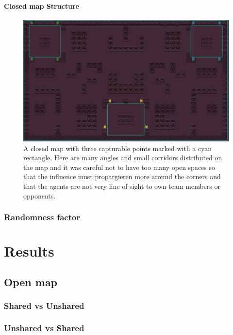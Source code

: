 \documentclass[]{report}
\begin{document}
		\subsubsection{Closed map Structure}
		\begin{figure}[h!]
			\centering
			\includegraphics[width=1\linewidth]{Images/closemap}
			\caption[Close map structure]{A closed map with three capturable points marked with a cyan rectangle. Here are many angles and small corridors distributed on the map and it was careful not to have too many open spaces so that the influence must propargieren more around the corners and that the agents are not very line of sight to own team members or opponents.}
			\label{fig:close-map}
		\end{figure}
		
		
		
		\subsection{Randomness factor} \label{ssec:rf}
		
		\chapter{Results}
		\section{Open map}
		\subsection{Shared vs Unshared}
		\subsection{Unshared vs Shared}
\end{document}
